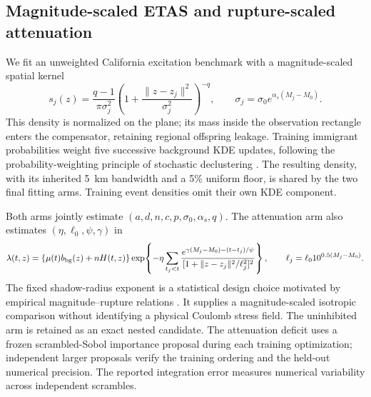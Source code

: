 \subsection{Magnitude-scaled ETAS and rupture-scaled attenuation}
\label{sec:epplus_benchmark}
We fit an unweighted California excitation benchmark with a
magnitude-scaled spatial kernel
\[
 s_j(z)=\frac{q-1}{\pi\sigma_j^2}
       \left(1+\frac{\|z-z_j\|^2}{\sigma_j^2}\right)^{-q},
 \qquad \sigma_j=\sigma_0 e^{\alpha_s(M_j-M_0)}.
\]
This density is normalized on the plane; its mass inside the observation
rectangle enters the compensator, retaining regional offspring leakage.
Training immigrant probabilities weight five successive background KDE updates,
following the probability-weighting principle of stochastic declustering
\cite{zhuang2002declustering}. The resulting density, with its inherited 5~km
bandwidth and a 5\% uniform floor, is shared by the two final fitting arms.
Training event densities omit their own KDE component.

Both arms jointly estimate $(a,d,n,c,p,\sigma_0,\alpha_s,q)$.
The attenuation arm also estimates $(\eta,\ell_0,\psi,\gamma)$ in
\[
 \lambda(t,z)=\{\mu(t)b_{\rm bg}(z)+nH(t,z)\}
 \exp\!\left\{-\eta\sum_{t_j<t}
 \frac{e^{\gamma(M_j-M_0)-(t-t_j)/\psi}}
 {[1+\|z-z_j\|^2/\ell_j^2]^2}\right\},
 \qquad \ell_j=\ell_0 10^{0.5(M_j-M_0)}.
\]
The fixed shadow-radius exponent is a statistical design choice motivated by
empirical magnitude--rupture relations \cite{wells1994rupture}. It supplies a
magnitude-scaled isotropic comparison without identifying a physical Coulomb
stress field. The uninhibited arm is retained as an exact nested candidate.
The attenuation deficit uses a frozen scrambled-Sobol importance proposal during
each training optimization; independent larger proposals verify the training
ordering and the held-out numerical precision. The reported integration error
measures numerical variability across independent scrambles.

